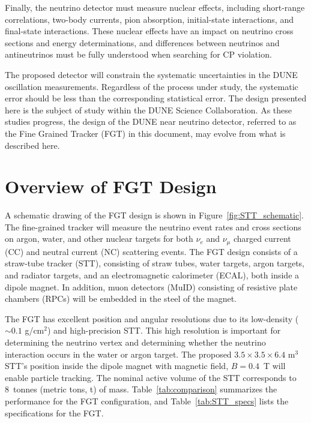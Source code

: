 Finally, the neutrino detector must measure nuclear effects, including
short-range correlations, two-body currents, pion absorption, initial-state interactions, 
and final-state interactions. These nuclear effects 
have an impact on neutrino cross sections and energy determinations, and differences
between neutrinos and antineutrinos must be fully understood when searching
for CP violation.

The proposed detector will constrain the systematic uncertainties in the DUNE 
oscillation measurements. Regardless of the process under study, the 
systematic error should be less than the corresponding statistical error. 
The design presented here is the subject of study within the DUNE Science 
Collaboration. As these studies 
progress, the design of the DUNE near neutrino detector, 
referred to as the Fine Grained Tracker (FGT) in this document, may 
evolve from what is described here. 

\section{Overview of FGT Design}
\label{sec:nd-nnd-fgt}

A schematic drawing of the 
FGT design is shown in Figure~\ref{fig:STT_schematic}. 
The fine-grained tracker %
will measure the neutrino event rates and cross sections 
on argon, water, and other nuclear 
targets for both $\nu_e$ and $\nu_\mu$ charged current (CC) and
neutral current (NC) scattering events. The FGT design 
consists of a straw-tube tracker (STT), consisting of straw tubes, water targets, argon targets, 
and radiator targets, and an electromagnetic calorimeter (ECAL), both inside a
dipole magnet. In addition, muon detectors (MuID) consisting of resistive plate
chambers (RPCs) will be embedded in the steel
of the magnet. 

The FGT has excellent position and angular resolutions due to
its low-density ($\sim 0.1$ g/cm$^2$) and high-precision STT. This high 
resolution is important for determining the neutrino
vertex and determining whether the neutrino interaction occurs in the water
or argon target.  The
proposed $3.5\times3.5\times6.4$ m$^3$ STT's position inside the 
dipole magnet with magnetic field, $B = 0.4$~T will enable particle tracking. 
The nominal active volume of the STT corresponds to 8~tonnes (metric tons, t) of mass. 
Table~\ref{tab:comparison} summarizes the
performance for the FGT configuration, and
Table~\ref{tab:STT_specs} lists the specifications for the FGT. 

